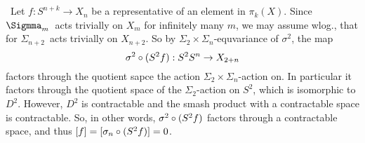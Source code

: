 
\def \L{\mathbb{L}}
\def \O{\mathcal{O}}


\mmaketitle

\begin{exercise}[1]\ 
\end{exercise}

\begin{exercise}[2]\ 
\end{exercise}

\begin{exercise}[3]\ 
Let $f : S^{n+k} \to X_n$ be a representative of an element in $\pi_k(X)$.
Since $\Sigmma_m$ acts trivially on $X_m$ for infinitely many $m$, we may assume
wlog., that for $\Sigma_{n+2}$ acts trivially on $X_{n+2}$. 
So by $\Sigma_2 \times \Sigma_n$-equvariance of $\sigma^2$, the map
\[ \sigma^2 \circ (S^2 \smash f) : S^2 \smash S^n \to X_{2+n} \]
factors through the quotient sapce the action $\Sigma_2 \times
\Sigma_n$-action on. In particular it factors through the quotient space of the
$\Sigma_2$-action on $S^2$, which is isomorphic to $D^2$. However, $D^2$ is
contractable and the smash product with a contractable space is contractable.
So, in other words,
$\sigma^2 \circ (S^2 \smash f)$ factors through a contractable space, and thus 
$[f] = [\sigma_n \circ (S^2 \smash f)] = 0$.
\end{exercise}



